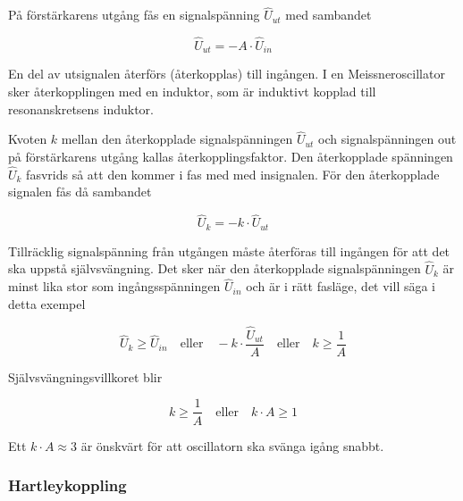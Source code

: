 På förstärkarens utgång fås en signalspänning \(\hat{U}_{ut}\) med sambandet

\[\hat{U}_{ut} = -A \cdot \hat{U}_{in}\]

En del av utsignalen återförs (återkopplas) till ingången.
I en Meissneroscillator sker återkopplingen med en induktor, som är
induktivt kopplad till resonanskretsens induktor.

Kvoten \(k\) mellan den återkopplade signalspänningen \(\hat{U}_{ut}\) och
signalspänningen out på förstärkarens utgång kallas återkopplingsfaktor.
Den återkopplade spänningen \(\hat{U}_k\) fasvrids så att den kommer
i fas med med insignalen.
För den återkopplade signalen fås då sambandet

\[\hat{U}_k = -k \cdot \hat{U}_{ut}\]

Tillräcklig signalspänning från utgången måste återföras till ingången
för att det ska uppstå självsvängning.
Det sker när den återkopplade signalspänningen \(\hat{U}_k\) är minst lika stor
som ingångsspänningen \(\hat{U}_{in}\) och är i rätt fasläge, det vill säga i
detta exempel

\[
\hat{U}_k \geq \hat{U}_{in}
\quad \text{eller} \quad
-k \cdot \frac{\hat{U}_{ut}}{A}
\quad \text{eller} \quad
k \geq \frac{1}{A}
\]

Självsvängningsvillkoret blir

\[
k \geq \frac{1}{A}
\quad \text{eller} \quad
k \cdot A \geq 1
\]

Ett \(k \cdot A \approx 3\) är önskvärt för att oscillatorn ska svänga igång
snabbt.

\subsubsection{Hartleykoppling}

